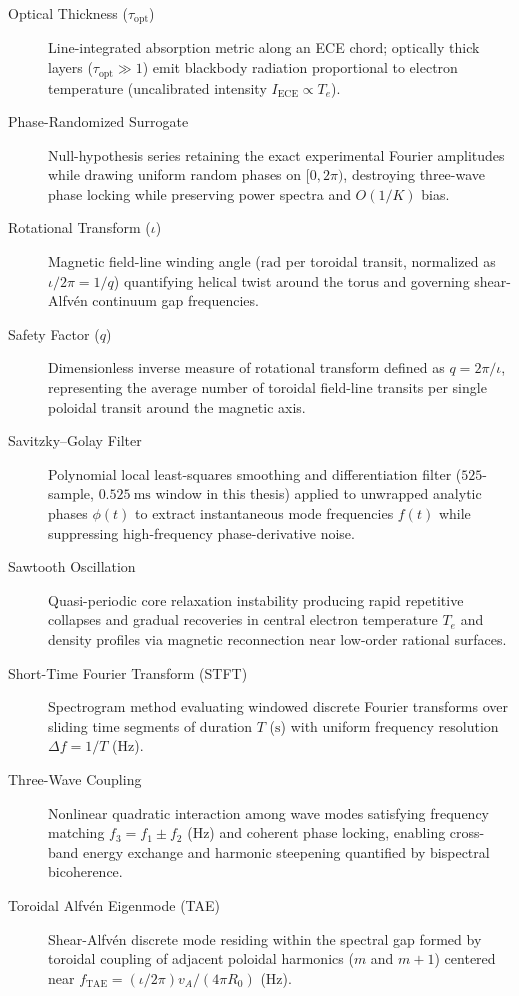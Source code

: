 \begin{description}
\item[Optical Thickness ($\tau_{\mathrm{opt}}$)] Line-integrated absorption metric along an ECE chord; optically thick layers ($\tau_{\mathrm{opt}} \gg 1$) emit blackbody radiation proportional to electron temperature (uncalibrated intensity $I_{\mathrm{ECE}} \propto T_e$).

\item[Phase-Randomized Surrogate] Null-hypothesis series retaining the exact experimental Fourier amplitudes while drawing uniform random phases on $[0, 2\pi)$, destroying three-wave phase locking while preserving power spectra and $O(1/K)$ bias.

\item[Rotational Transform ($\iota$)] Magnetic field-line winding angle ($\mathrm{rad}$ per toroidal transit, normalized as $\iota/2\pi = 1/q$) quantifying helical twist around the torus and governing shear-Alfv\'{e}n continuum gap frequencies.

\item[Safety Factor ($q$)] Dimensionless inverse measure of rotational transform defined as $q = 2\pi/\iota$, representing the average number of toroidal field-line transits per single poloidal transit around the magnetic axis.

\item[Savitzky--Golay Filter] Polynomial local least-squares smoothing and differentiation filter ($525$-sample, $0.525~\mathrm{ms}$ window in this thesis) applied to unwrapped analytic phases $\phi(t)$ to extract instantaneous mode frequencies $f(t)$ while suppressing high-frequency phase-derivative noise.

\item[Sawtooth Oscillation] Quasi-periodic core relaxation instability producing rapid repetitive collapses and gradual recoveries in central electron temperature $T_e$ and density profiles via magnetic reconnection near low-order rational surfaces.

\item[Short-Time Fourier Transform (STFT)] Spectrogram method evaluating windowed discrete Fourier transforms over sliding time segments of duration $T$ ($\mathrm{s}$) with uniform frequency resolution $\Delta f = 1/T$ ($\mathrm{Hz}$).

\item[Three-Wave Coupling] Nonlinear quadratic interaction among wave modes satisfying frequency matching $f_3 = f_1 \pm f_2$ ($\mathrm{Hz}$) and coherent phase locking, enabling cross-band energy exchange and harmonic steepening quantified by bispectral bicoherence.

\item[Toroidal Alfv\'{e}n Eigenmode (TAE)] Shear-Alfv\'{e}n discrete mode residing within the spectral gap formed by toroidal coupling of adjacent poloidal harmonics ($m$ and $m+1$) centered near $f_{\mathrm{TAE}} = (\iota/2\pi)v_A/(4\pi R_0)$ ($\mathrm{Hz}$).
\end{description}
